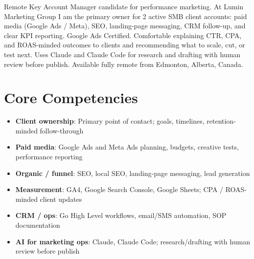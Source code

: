 \documentclass[11pt,a4paper,sans]{moderncv}
\begin{document}
\makecvtitle

\vspace{6pt}
\small{Remote Key Account Manager candidate for performance marketing. At Lumin Marketing Group I am the primary owner for 2 active SMB client accounts: paid media (Google Ads / Meta), SEO, landing-page messaging, CRM follow-up, and clear KPI reporting. Google Ads Certified. Comfortable explaining CTR, CPA, and ROAS-minded outcomes to clients and recommending what to scale, cut, or test next. Uses Claude and Claude Code for research and drafting with human review before publish. Available fully remote from Edmonton, Alberta, Canada.}

\section{Core Competencies}
\vspace{1pt}
\begin{itemize}
\item \textbf{Client ownership}: Primary point of contact; goals, timelines, retention-minded follow-through
\item \textbf{Paid media}: Google Ads and Meta Ads planning, budgets, creative tests, performance reporting
\item \textbf{Organic / funnel}: SEO, local SEO, landing-page messaging, lead generation
\item \textbf{Measurement}: GA4, Google Search Console, Google Sheets; CPA / ROAS-minded client updates
\item \textbf{CRM / ops}: Go High Level workflows, email/SMS automation, SOP documentation
\item \textbf{AI for marketing ops}: Claude, Claude Code; research/drafting with human review before publish
\end{itemize}
\end{document}
